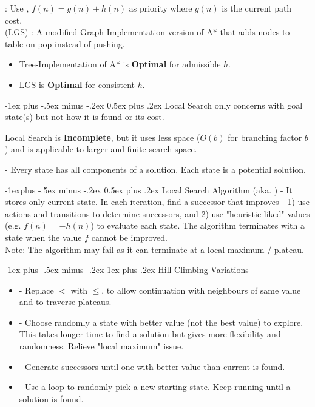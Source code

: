 \documentclass[10pt,landscape,letterpaper]{article}
\makeatletter
\renewcommand{\section}{\@startsection{section}{1}{0mm}%
                                {-1ex plus -.5ex minus -.2ex}%
                                {0.5ex plus .2ex}%
                                {\sffamily\large}}
\renewcommand{\subsection}{\@startsection{subsection}{2}{0mm}%
                                {-1explus -.5ex minus -.2ex}%
                                {0.5ex plus .2ex}%
                                {\sffamily\normalsize\itshape}}
\renewcommand{\subsubsection}{\@startsection{subsubsection}{3}{0mm}%
                                {-1ex plus -.5ex minus -.2ex}%
                                {1ex plus .2ex}%
                                {\normalfont\small\itshape}}
\makeatother
\begin{document}
\begin{multicols}{3}
 : Use , $f(n) = g(n) + h(n)$ as priority where $g(n)$ is the current path cost.
\\
 (LGS) : A modified Graph-Implementation version of A* that adds nodes to  table on pop instead of pushing.
\begin{itemize}
    \item Tree-Implementation of A* is \textbf{Optimal} for admissible $h$.
    \item LGS is \textbf{Optimal} for consistent $h$.
\end{itemize}




\section{Local Search}
 only concerns with goal state(s) but not how it is found or its cost. 
\smallskip

Local Search is \textbf{Incomplete}, but it uses less space ($O(b)$ for branching factor $b$) and is applicable to larger and finite search space.
\smallskip

 - Every state has all components of a solution. Each state is a potential solution.

\subsection{Local Search Algorithm}
 (aka. ) - It stores only current state. In each iteration, find a successor that improves - 1) use actions and transitions to determine successors, and 2) use "heuristic-liked" values (e.g. $f(n) = -h(n)$) to evaluate each state. The algorithm terminates with a state when the value $f$ cannot be improved.
\\
Note: The algorithm may fail as it can terminate at a local maximum / plateau.

\subsubsection{Hill Climbing Variations}
\begin{itemize}
    \item {} - Replace $<$ with $\leq$, to allow continuation with neighbours of same value and to traverse plateaus.
    \item {} - Choose randomly a state with better value (not the best value) to explore. This takes longer time to find a solution but gives more flexibility and randomness. Relieve "local maximum" issue.
    \item {} - Generate successors until one with better value than current is found.
    \item {} - Use a loop to randomly pick a new starting state. Keep running until a solution is found.
\end{itemize}


\end{multicols}
\end{document}
